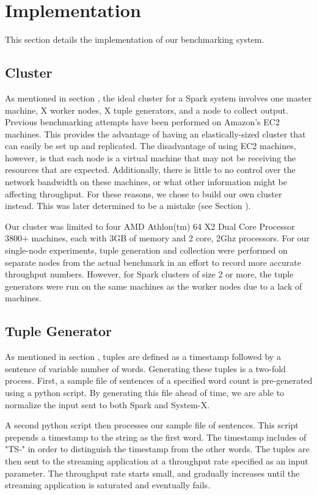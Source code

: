 \section{Implementation}
This section details the implementation of our benchmarking system.
\subsection{Cluster}
As mentioned in section , the ideal cluster for a Spark system involves one master machine, X worker nodes, X tuple generators, and a node to collect output.  Previous benchmarking attempts have been performed on Amazon's EC2 machines.  This provides the advantage of having an elastically-sized cluster that can easily be set up and replicated.  The disadvantage of using EC2 machines, however, is that each node is a virtual machine that may not be receiving the resources that are expected.  Additionally, there is little to no control over the network bandwidth on these machines, or what other information might be affecting throughput.  For these reasons, we chose to build our own cluster instead.  This was later determined to be a mistake (see Section ).

Our cluster was limited to four AMD Athlon(tm) 64 X2 Dual Core Processor 3800+ machines, each with 3GB of memory and 2 core, 2Ghz processors.  For our single-node experiments, tuple generation and collection were performed on separate nodes from the actual benchmark in an effort to record more accurate throughput numbers.  However, for Spark clusters of size 2 or more, the tuple generators were run on the same machines as the worker nodes due to a lack of machines.

\subsection{Tuple Generator}
As mentioned in section , tuples are defined as a timestamp followed by a sentence of variable number of words.  Generating these tuples is a two-fold process.  First, a sample file of sentences of a specified word count is pre-generated using a python script.  By generating this file ahead of time, we are able to normalize the input sent to both Spark and System-X.

A second python script then processes our sample file of sentences.  This script prepends a timestamp to the string as the first word.  The timestamp includes of "TS-" in order to distinguish the timestamp from the other words.  The tuples are then sent to the streaming application at a throughput rate specified as an input parameter.  The throughput rate starts small, and gradually increases until the streaming application is saturated and eventually fails.

